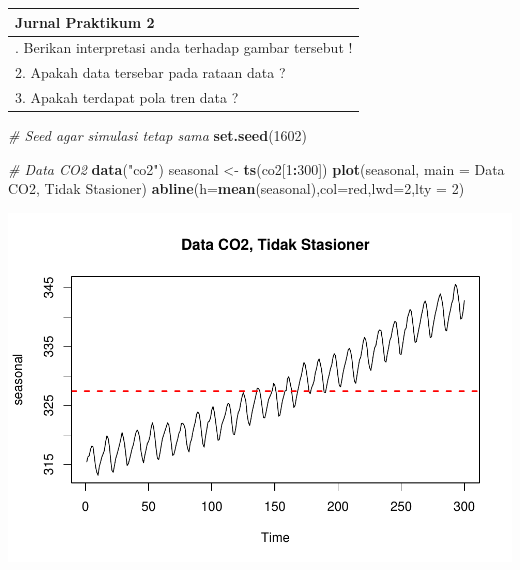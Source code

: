 \documentclass[
]{book}
\newenvironment{Shaded}{\begin{snugshade}}{\end{snugshade}}
\newcommand{\AttributeTok}[1]{\textcolor[rgb]{0.13,0.29,0.53}{#1}}
\newcommand{\CommentTok}[1]{\textcolor[rgb]{0.56,0.35,0.01}{\textit{#1}}}
\newcommand{\DecValTok}[1]{\textcolor[rgb]{0.00,0.00,0.81}{#1}}
\newcommand{\FunctionTok}[1]{\textcolor[rgb]{0.13,0.29,0.53}{\textbf{#1}}}
\newcommand{\NormalTok}[1]{#1}
\newcommand{\OtherTok}[1]{\textcolor[rgb]{0.56,0.35,0.01}{#1}}
\newcommand{\SpecialCharTok}[1]{\textcolor[rgb]{0.81,0.36,0.00}{\textbf{#1}}}
\newcommand{\StringTok}[1]{\textcolor[rgb]{0.31,0.60,0.02}{#1}}
\begin{document}
\begin{longtable}[]{@{}l@{}}
\toprule\noalign{}
Jurnal Praktikum 2 \\
\midrule\noalign{}
\endhead
\bottomrule\noalign{}
\endlastfoot
1. Berikan interpretasi anda terhadap gambar tersebut ! \\
2. Apakah data tersebar pada rataan data ? \\
3. Apakah terdapat pola tren data ? \\
\end{longtable}

\begin{Shaded}
\begin{Highlighting}[]
\CommentTok{\# Seed agar simulasi tetap sama}
\FunctionTok{set.seed}\NormalTok{(}\DecValTok{1602}\NormalTok{)}

\CommentTok{\# Data CO2}
\FunctionTok{data}\NormalTok{(}\StringTok{"co2"}\NormalTok{)}
\NormalTok{seasonal }\OtherTok{\textless{}{-}} \FunctionTok{ts}\NormalTok{(co2[}\DecValTok{1}\SpecialCharTok{:}\DecValTok{300}\NormalTok{])}
\FunctionTok{plot}\NormalTok{(seasonal, }\AttributeTok{main =} \StringTok{\textquotesingle{}Data CO2, Tidak Stasioner\textquotesingle{}}\NormalTok{)}
\FunctionTok{abline}\NormalTok{(}\AttributeTok{h=}\FunctionTok{mean}\NormalTok{(seasonal),}\AttributeTok{col=}\StringTok{\textquotesingle{}red\textquotesingle{}}\NormalTok{,}\AttributeTok{lwd=}\DecValTok{2}\NormalTok{,}\AttributeTok{lty =} \DecValTok{2}\NormalTok{)}
\end{Highlighting}
\end{Shaded}

\begin{center}\includegraphics{_main_files/figure-latex/Contoh Plot yang Stasioner daan Tidak Stasioner-1} \end{center}
\end{document}
